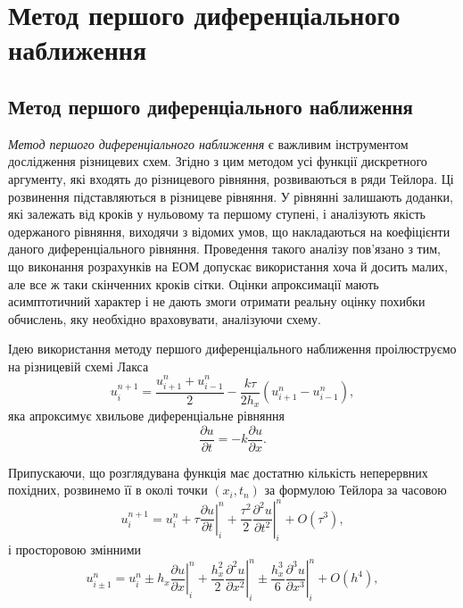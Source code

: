 \chapter{Метод першого диференціального наближення}


\section{Метод першого диференціального наближення}

\emph{Метод першого диференціального наближення} є важливим інструментом дослідження різницевих схем. Згідно з цим методом усі функції дискретного аргументу, які входять до різницевого рівняння, розвиваються в ряди Тейлора. Ці розвинення підставляються в різницеве рівняння. У рівнянні залишають доданки, які залежать від кроків у нульовому та першому ступені, і аналізують якість одержаного рівняння, виходячи з відомих умов, що накладаються на коефіцієнти даного диференціального рівняння. Проведення такого аналізу пов'язано з тим, що виконання розрахунків на ЕОМ допускає використання хоча й досить малих, але все ж таки скінченних кроків сітки. Оцінки апроксимації мають асимптотичний  характер і не дають змоги отримати реальну оцінку похибки обчислень, яку необхідно враховувати, аналізуючи схему.

\begin{example}
    Ідею використання методу першого диференціального наближення проілюструємо на різницевій схемі Лакса 
    \begin{equation}
        \label{eq:l9.1}
        u_i^{n+1} = \frac{u_{i+1}^n+u_{i-1}^n}{2} -\frac{k\tau}{2h_x}(u_{i+1}^n-u_{i-1}^n),
    \end{equation}
    яка апроксимує хвильове диференціальне рівняння 
    \begin{equation}
        \label{eq:l9.2}
    	\frac{\partial u}{\partial t} = -k \frac{\partial u}{\partial x}.
    \end{equation}
\end{example}

Припускаючи, що розглядувана функція має достатню кількість неперервних похідних, розвинемо її в околі точки $(x_i,t_n)$ за формулою Тейлора за часовою
\begin{equation*}
    u_i^{n+1}=u_i^n+\tau\left.\frac{\partial u}{\partial t}\right|_i^n+\frac{\tau^2}{2}\left.\frac{\partial^2 u}{\partial t^2}\right|_i^n+O(\tau^3),
\end{equation*}
і просторовою змінними
\begin{equation*}
    u_{i\pm1}^n=u_i^n\pm h_x\left.\frac{\partial u}{\partial x}\right|_i^n+\frac{h_x^2}{2}\left.\frac{\partial^2 u}{\partial x^2}\right|_i^n\pm\frac{h_x^3}{6}\left.\frac{\partial^3 u}{\partial x^3}\right|_i^n+O(h^4),
\end{equation*}

